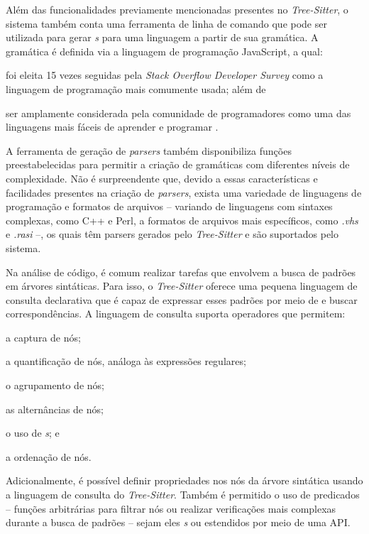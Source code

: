 \documentclass[11pt, a4paper, english, openright, twoside, brazil]{abntex2}
\begin{document}
  Além das funcionalidades previamente mencionadas presentes no
  \textit{Tree-Sitter}, o sistema também conta uma ferramenta de linha de
  comando que pode ser utilizada para gerar \textit{s} para uma
  linguagem a partir de sua gramática. A gramática é definida via a linguagem
  de programação JavaScript, a qual:
  \begin{inparaenum}
    \item foi eleita 15 vezes seguidas pela
          \textit{Stack Overflow Developer Survey}
          \cite{stack-overflow-2022-stack} como a linguagem de programação mais
          comumente usada; além de
    \item ser amplamente considerada pela comunidade de programadores
          como uma das linguagens mais fáceis de aprender e programar
          \cites {berkeley-2023-11}{goel-2023-how}{w3schools-2023-javascript}.
  \end{inparaenum}
  A ferramenta de geração de \textit{parsers} também disponibiliza funções
  preestabelecidas para permitir a criação de gramáticas com diferentes níveis
  de complexidade. Não é surpreendente que, devido a essas características e
  facilidades presentes na criação de \textit{parsers}, exista uma variedade de
  linguagens de programação e formatos de arquivos -- variando de linguagens
  com sintaxes complexas, como C++ e Perl, a formatos de arquivos mais
  específicos, como \textit{.vhs} e \textit{.rasi} --, os quais têm parsers
  gerados pelo \textit{Tree-Sitter} e são suportados pelo sistema.

  Na análise de código, é comum realizar tarefas que envolvem a busca de
  padrões em árvores sintáticas. Para isso, o \textit{Tree-Sitter} oferece uma
  pequena linguagem de consulta declarativa que é capaz de expressar esses
  padrões por meio de \textit{} e buscar correspondências. A
  linguagem de consulta suporta operadores que permitem:
  \begin{inparaenum}
    \item a captura de nós;
    \item a quantificação de nós, análoga às expressões regulares;
    \item o agrupamento de nós;
    \item as alternâncias de nós;
    \item o uso de \textit{s}; e
    \item a ordenação de nós.
  \end{inparaenum}
  Adicionalmente, é possível definir propriedades nos nós da árvore sintática
  usando a linguagem de consulta do \textit{Tree-Sitter}. Também é permitido o
  uso de predicados -- funções arbitrárias para filtrar nós ou realizar
  verificações mais complexas durante a busca de padrões -- sejam eles
  \textit{s} ou estendidos por meio de uma API.
\end{document}
